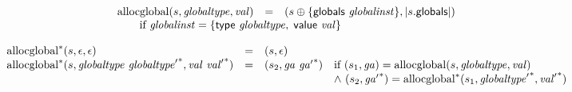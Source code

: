 $$
\begin{array}[t]{@{}lcl@{}l@{}}
{\mathrm{allocglobal}}(s, {\mathit{globaltype}}, {\mathit{val}}) & = & (s \oplus \{ \mathsf{globals}~{\mathit{globalinst}} \}, {|s{.}\mathsf{globals}|}) &  \\
 \multicolumn{4}{@{}l@{}}{\quad
\quad \mbox{if}~ {\mathit{globalinst}} = \{ \mathsf{type}~{\mathit{globaltype}},\;\allowbreak \mathsf{value}~{\mathit{val}} \}
} \\
\end{array}
$$

$$
\begin{array}[t]{@{}lcl@{}l@{}}
{{{\mathrm{allocglobal}}^\ast}}{(s, \epsilon, \epsilon)} & = & (s, \epsilon) \\
{{{\mathrm{allocglobal}}^\ast}}{(s, {\mathit{globaltype}}~{{\mathit{globaltype}'}^\ast}, {\mathit{val}}~{{\mathit{val}'}^\ast})} & = & (s_2, {\mathit{ga}}~{{\mathit{ga}'}^\ast}) & \quad
\begin{array}[t]{@{}l@{}}
\mbox{if}~ (s_1, {\mathit{ga}}) = {\mathrm{allocglobal}}(s, {\mathit{globaltype}}, {\mathit{val}}) \\
{\land}~ (s_2, {{\mathit{ga}'}^\ast}) = {{{\mathrm{allocglobal}}^\ast}}{(s_1, {{\mathit{globaltype}'}^\ast}, {{\mathit{val}'}^\ast})} \\
\end{array} \\
\end{array}
$$

